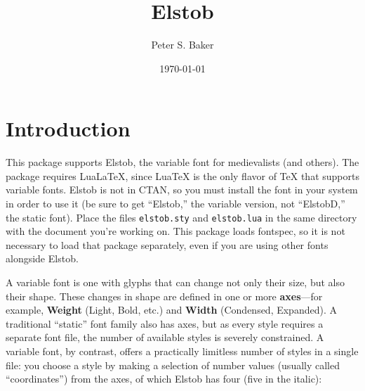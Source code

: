 \documentclass[12pt]{article}
\title{Elstob}
\author{Peter S. Baker}
\date{\today}
\newcommand{\ltech}{Lua\kern-1.5pt\TeX}
\newcommand{\lltech}{Lua\LaTeX}
\newcommand{\fspec}{{\sffamily fontspec}}
\newcommand{\src}[1]{{\color{BrickRed}\texttt{#1}}}
\begin{document}
\maketitle

\section{Introduction}

\pagestyle{fancy}

This package supports Elstob, the variable font for medievalists (and others).
The package requires \lltech, since {\ltech} is
the only flavor of {\TeX} that supports variable fonts. Elstob is not in CTAN, so you must
install the font in your system in order to use it (be sure to get “Elstob,” the variable
version, not “ElstobD,” the static font). Place the files \src{elstob.sty} and
\src{elstob.lua} in the same
directory with the document you're working on. This package loads
\fspec, so it is not necessary to load that package separately, even if you are using
other fonts alongside Elstob.

A variable font is one with glyphs that can change not only their size, but also their
shape. These changes in shape are defined in one or more \textbf{axes}---for example,
\textbf{Weight} (Light, Bold, etc.) and \textbf{Width} (Condensed, Expanded). A traditional
“static” font family also has axes, but as every style requires a separate font file,
the number of available styles is severely constrained. A variable font, by contrast,
offers a practically limitless number of styles in a single file: you choose a style
by making a selection of number values (usually called “coordinates”) from the axes, 
of which Elstob has four (five in the italic):
\end{document}
